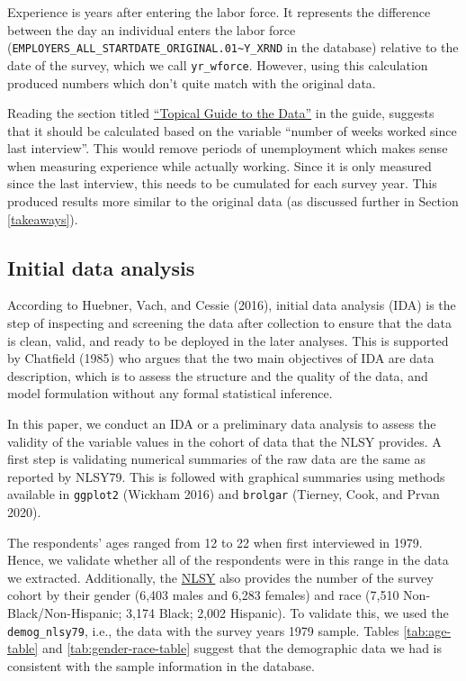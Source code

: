 \documentclass{article}
\begin{document}
Experience is years after entering the labor force. It represents the difference between the day an individual enters the labor force (\texttt{EMPLOYERS\_ALL\_STARTDATE\_ORIGINAL.01\textasciitilde{}Y\_XRND} in the database) relative to the date of the survey, which we call \texttt{yr\_wforce}. However, using this calculation produced numbers which don't quite match with the original data.

Reading the section titled \href{https://www.nlsinfo.org/content/cohorts/nlsy79/topical-guide/employment/work-experience}{``Topical Guide to the Data''} in the guide, suggests that it should be calculated based on the variable ``number of weeks worked since last interview''. This would remove periods of unemployment which makes sense when measuring experience while actually working. Since it is only measured since the last interview, this needs to be cumulated for each survey year. This produced results more similar to the original data (as discussed further in Section \ref{takeaways}).

\hypertarget{ida}{%
\subsection{Initial data analysis}\label{ida}}

According to Huebner, Vach, and Cessie (2016), initial data analysis (IDA) is the step of inspecting and screening the data after collection to ensure that the data is clean, valid, and ready to be deployed in the later analyses. This is supported by Chatfield (1985) who argues that the two main objectives of IDA are data description, which is to assess the structure and the quality of the data, and model formulation without any formal statistical inference.

In this paper, we conduct an IDA or a preliminary data analysis to assess the validity of the variable values in the cohort of data that the NLSY provides. A first step is validating numerical summaries of the raw data are the same as reported by NLSY79. This is followed with graphical summaries using methods available in \texttt{ggplot2} (Wickham 2016) and \texttt{brolgar} (Tierney, Cook, and Prvan 2020).

The respondents' ages ranged from 12 to 22 when first interviewed in 1979. Hence, we validate whether all of the respondents were in this range in the data we extracted. Additionally, the \href{https://www.nlsinfo.org/content/cohorts/nlsy79/intro-to-the-sample/nlsy79-sample-introduction}{NLSY} also provides the number of the survey cohort by their gender (6,403 males and 6,283 females) and race (7,510 Non-Black/Non-Hispanic; 3,174 Black; 2,002 Hispanic). To validate this, we used the \texttt{demog\_nlsy79}, i.e., the data with the survey years 1979 sample. Tables \ref{tab:age-table} and \ref{tab:gender-race-table} suggest that the demographic data we had is consistent with the sample information in the database.
\end{document}
